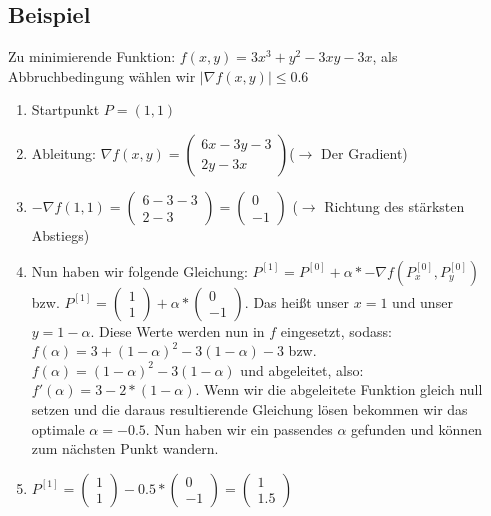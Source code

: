 \documentclass[a4paper, 11pt]{article}
\begin{document}
      \subsection{Beispiel}
      
      Zu minimierende Funktion: $f(x,y) = 3x^3+y^2-3xy-3x$, als Abbruchbedingung wählen wir $|{\nabla}f(x,y)| \leq 0.6$
      
\begin{enumerate}

	\item 
	Startpunkt $P=(1,1)$
	\item 
	Ableitung: ${\nabla}f(x,y)=
	\left( \begin{array}{c}
	6x-3y-3 \\ 
	2y-3x 
	\end{array} \right)
	$($\rightarrow$ Der Gradient)
	\item
	$-{\nabla}f(1,1) =
	\left( \begin{array}{c}
	6-3-3 \\ 
	2-3
	\end{array} \right)
	=
	\left( \begin{array}{c}
	0 \\ 
	-1
	\end{array} \right)
	$ ($\rightarrow$ Richtung des stärksten Abstiegs)
	
	\item
	Nun haben wir folgende Gleichung: $P^{[1]}=P^{[0]}+\alpha*-{\nabla}f(P^{[0]}_{x},P^{[0]}_{y})$ bzw. $P^{[1]}=\left( \begin{array}{c} 1 \\ 1 \end{array} \right) + \alpha * \left( \begin{array}{c} 0 \\ -1 \end{array} \right)$. Das heißt unser $x=1$ und unser $y=1-\alpha$. Diese Werte werden nun in $f$ eingesetzt, sodass: $f(\alpha)=3+(1-\alpha)^2-3(1-\alpha)-3$ bzw. $f(\alpha)=(1-\alpha)^2-3(1-\alpha)$ und abgeleitet, also: $f'(\alpha)=3-2*(1-\alpha)$. Wenn wir die abgeleitete Funktion gleich null setzen und die daraus resultierende Gleichung lösen bekommen wir das optimale $\alpha = -0.5$. Nun haben wir ein passendes $\alpha$ gefunden und können zum nächsten Punkt wandern.
	
	\item
	 $P^{[1]}=\left( \begin{array}{c} 1 \\ 1 \end{array} \right) -0.5 * \left( \begin{array}{c} 0 \\ -1 \end{array} \right) = \left( \begin{array}{c} 1 \\ 1.5 \end{array} \right)$
	 

\end{enumerate}
\end{document}
